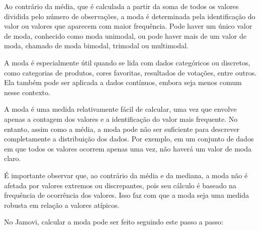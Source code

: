 \begin{figure}[H]
    \label{fig:circulo_moda}
\end{figure}

Ao contrário da média, que é calculada a partir da soma de todos os valores dividida pelo número de observações, a moda é determinada pela identificação do valor ou valores que aparecem com maior frequência. Pode haver um único valor de moda, conhecido como moda unimodal, ou pode haver mais de um valor de moda, chamado de moda bimodal, trimodal ou multimodal.

A moda é especialmente útil quando se lida com dados categóricos ou discretos, como categorias de produtos, cores favoritas, resultados de votações, entre outros. Ela também pode ser aplicada a dados contínuos, embora seja menos comum nesse contexto.

A moda é uma medida relativamente fácil de calcular, uma vez que envolve apenas a contagem dos valores e a identificação do valor mais frequente. No entanto, assim como a média, a moda pode não ser suficiente para descrever completamente a distribuição dos dados. Por exemplo, em um conjunto de dados em que todos os valores ocorrem apenas uma vez, não haverá um valor de moda claro.

É importante observar que, ao contrário da média e da mediana, a moda não é afetada por valores extremos ou discrepantes, pois seu cálculo é baseado na frequência de ocorrência dos valores. Isso faz com que a moda seja uma medida robusta em relação a valores atípicos.

No Jamovi, calcular a moda pode ser feito seguindo este passo a passo:

